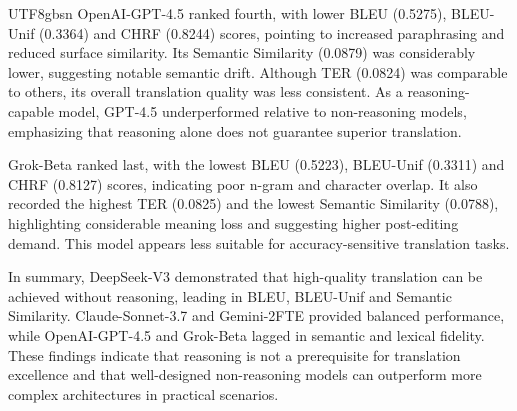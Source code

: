 \documentclass[conference]{IEEEtran}
\begin{document}
\begin{CJK*}{UTF8}{gbsn}
OpenAI-GPT-4.5 ranked fourth, with lower BLEU (0.5275), BLEU-Unif (0.3364) and CHRF (0.8244) scores, pointing to increased paraphrasing and reduced surface similarity. Its Semantic Similarity (0.0879) was considerably lower, suggesting notable semantic drift. Although TER (0.0824) was comparable to others, its overall translation quality was less consistent. As a reasoning-capable model, GPT-4.5 underperformed relative to non-reasoning models, emphasizing that reasoning alone does not guarantee superior translation.

Grok-Beta ranked last, with the lowest BLEU (0.5223), BLEU-Unif (0.3311) and CHRF (0.8127) scores, indicating poor n-gram and character overlap. It also recorded the highest TER (0.0825) and the lowest Semantic Similarity (0.0788), highlighting considerable meaning loss and suggesting higher post-editing demand. This model appears less suitable for accuracy-sensitive translation tasks.

In summary, DeepSeek-V3 demonstrated that high-quality translation can be achieved without reasoning, leading in BLEU, BLEU-Unif and Semantic Similarity. Claude-Sonnet-3.7 and Gemini-2FTE provided balanced performance, while OpenAI-GPT-4.5 and Grok-Beta lagged in semantic and lexical fidelity. These findings indicate that reasoning is not a prerequisite for translation excellence and that well-designed non-reasoning models can outperform more complex architectures in practical scenarios.




\color{black}




\end{CJK*}
\end{document}
